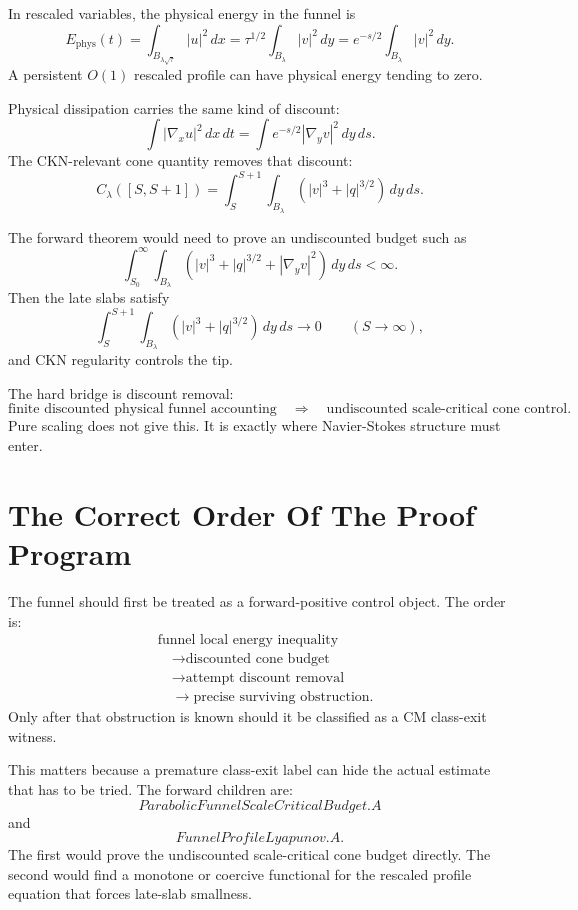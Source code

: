 \documentclass[11pt]{article}
\newcommand{\dd}{\,d}
\begin{document}
In rescaled variables, the physical energy in the funnel is
\[
E_{\mathrm{phys}}(t)
=
\int_{B_{\lambda\sqrt{\tau}}}|u|^2\dd x
=
\tau^{1/2}\int_{B_\lambda}|v|^2\dd y
=
e^{-s/2}\int_{B_\lambda}|v|^2\dd y.
\]
A persistent \(O(1)\) rescaled profile can have physical energy tending to zero.

Physical dissipation carries the same kind of discount:
\[
\int |\nabla_xu|^2\dd x\dd t
=
\int e^{-s/2}|\nabla_yv|^2\dd y\dd s.
\]
The CKN-relevant cone quantity removes that discount:
\[
C_\lambda([S,S+1])
=
\int_S^{S+1}\int_{B_\lambda}
\left(|v|^3+|q|^{3/2}\right)\dd y\dd s.
\]

The forward theorem would need to prove an undiscounted budget such as
\[
\int_{S_0}^{\infty}\int_{B_\lambda}
\left(|v|^3+|q|^{3/2}+|\nabla_yv|^2\right)\dd y\dd s
<\infty.
\]
Then the late slabs satisfy
\[
\int_S^{S+1}\int_{B_\lambda}
\left(|v|^3+|q|^{3/2}\right)\dd y\dd s
\to0
\qquad(S\to\infty),
\]
and CKN regularity controls the tip.

The hard bridge is discount removal:
\[
\text{finite discounted physical funnel accounting}
\quad\Longrightarrow\quad
\text{undiscounted scale-critical cone control}.
\]
Pure scaling does not give this. It is exactly where Navier-Stokes structure must enter.

\section{The Correct Order Of The Proof Program}

The funnel should first be treated as a forward-positive control object. The order is:
\[
\begin{aligned}
&\text{funnel local energy inequality}\\
&\quad\to \text{discounted cone budget}\\
&\quad\to \text{attempt discount removal}\\
&\quad\to \text{precise surviving obstruction}.
\end{aligned}
\]
Only after that obstruction is known should it be classified as a CM class-exit witness.

This matters because a premature class-exit label can hide the actual estimate that has to be tried. The forward children are:
\[
\boxed{ParabolicFunnelScaleCriticalBudget.A}
\]
and
\[
\boxed{FunnelProfileLyapunov.A}.
\]
The first would prove the undiscounted scale-critical cone budget directly. The second would find a monotone or coercive functional for the rescaled profile equation that forces late-slab smallness.
\end{document}
